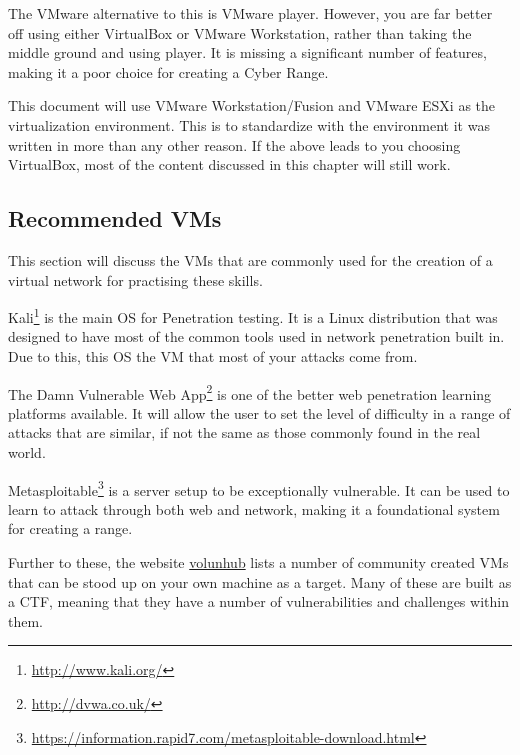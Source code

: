 			The VMware alternative to this is VMware player.
			However, you are far better off using either VirtualBox or VMware Workstation, rather than taking the middle ground and using player.
			It is missing a significant number of features, making it a poor choice for creating a Cyber Range.

			This document will use VMware Workstation/Fusion and VMware ESXi as the virtualization environment.
			This is to standardize with the environment it was written in more than any other reason.
			If the above leads to you choosing VirtualBox, most of the content discussed in this chapter will still work.

		\subsection{Recommended VMs}
			This section will discuss the VMs that are commonly used for the creation of a virtual network for practising these skills.
			\begin{description}
				\item[Kali Linux] Kali\footnote{\url{http://www.kali.org/}} is the main OS for Penetration testing.
					It is a Linux distribution that was designed to have most of the common tools used in network penetration built in.
					Due to this, this OS the VM that most of your attacks come from.
				\item[DVWA] The Damn Vulnerable Web App\footnote{\url{http://dvwa.co.uk/}} is one of the better web penetration learning platforms available.
					It will allow the user to set the level of difficulty in a range of attacks that are similar, if not the same as those commonly found in the real world.
				\item[Metasploitable] Metasploitable\footnote{\url{https://information.rapid7.com/metasploitable-download.html}} is a server setup to be exceptionally vulnerable.
					It can be used to learn to attack through both web and network, making it a foundational system for creating a range.
			\end{description}

			Further to these, the website \href{vulnhub.com}{volunhub} lists a number of community created VMs that can be stood up on your own machine as a target.
			Many of these are built as a CTF, meaning that they have a number of vulnerabilities and challenges within them.

